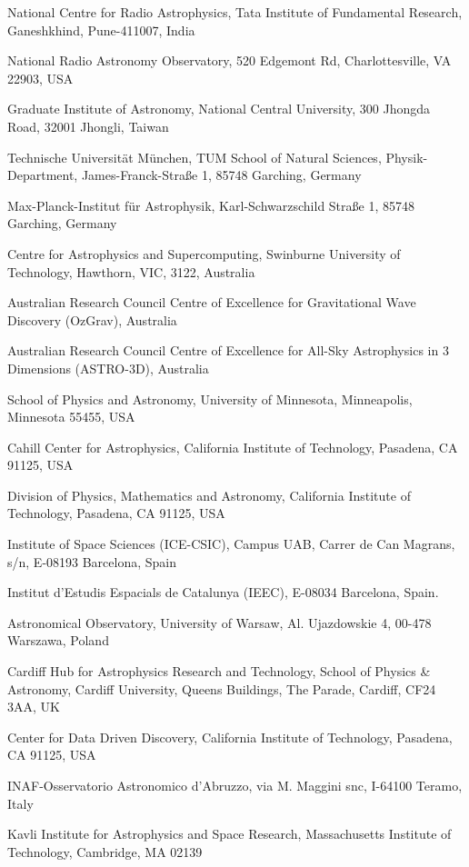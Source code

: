 \documentclass{nature_plusfigure}
\begin{document}
\begin{small}
\begin{affiliations}
\item National Centre for Radio Astrophysics, Tata Institute of Fundamental Research, Ganeshkhind, Pune-411007, India
\item National Radio Astronomy Observatory, 520 Edgemont Rd, Charlottesville, VA 22903, USA
\item Graduate Institute of Astronomy, National Central University, 300 Jhongda Road, 32001 Jhongli, Taiwan
\item Technische Universit{\"a}t M{\"u}nchen, TUM School of Natural Sciences, Physik-Department, James-Franck-Stra{\ss}e 1, 85748 Garching, Germany
\item Max-Planck-Institut f{\"u}r Astrophysik, Karl-Schwarzschild Stra{\ss}e 1, 85748 Garching, Germany
\item Centre for Astrophysics and Supercomputing, Swinburne University of Technology, Hawthorn, VIC, 3122, Australia
\item Australian Research Council Centre of Excellence for Gravitational Wave Discovery (OzGrav), Australia
\item Australian Research Council Centre of Excellence for All-Sky Astrophysics in 3 Dimensions (ASTRO-3D), Australia
\item School of Physics and Astronomy, University of Minnesota, Minneapolis, Minnesota 55455, USA
\item Cahill Center for Astrophysics, California Institute of Technology, Pasadena, CA 91125, USA
\item Division of Physics, Mathematics and Astronomy, California Institute of Technology, Pasadena, CA 91125, USA
\item Institute of Space Sciences (ICE-CSIC), Campus UAB, Carrer de Can Magrans, s/n, E-08193 Barcelona, Spain
\item Institut d’Estudis Espacials de Catalunya (IEEC), E-08034 Barcelona, Spain.
\item Astronomical Observatory, University of Warsaw, Al. Ujazdowskie 4, 00-478 Warszawa, Poland
\item Cardiff Hub for Astrophysics Research and Technology, School of Physics \& Astronomy, Cardiff University, Queens Buildings, The Parade, Cardiff, CF24 3AA, UK
\item Center for Data Driven Discovery, California Institute of Technology, Pasadena, CA 91125, USA
\item INAF-Osservatorio Astronomico d’Abruzzo, via M. Maggini snc, I-64100 Teramo, Italy
\item Kavli Institute for Astrophysics and Space Research, Massachusetts Institute of Technology, Cambridge, MA 02139

\end{affiliations}
\end{small}
\end{document}
